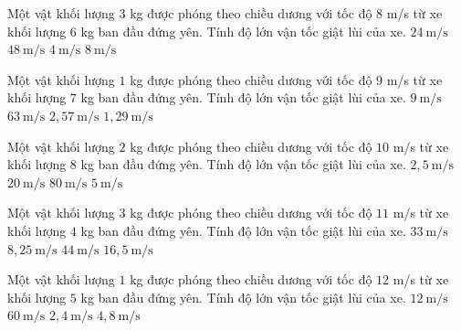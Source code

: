 \begin{ex}
Một vật khối lượng $3$ kg được phóng theo chiều dương với tốc độ $8$ m/s từ xe khối lượng $6$ kg ban đầu đứng yên. Tính độ lớn vận tốc giật lùi của xe.
\choice
{$24\ \mathrm{m/s}$}
{$48\ \mathrm{m/s}$}
{\True $4\ \mathrm{m/s}$}
{$8\ \mathrm{m/s}$}
\end{ex}

\begin{ex}
Một vật khối lượng $1$ kg được phóng theo chiều dương với tốc độ $9$ m/s từ xe khối lượng $7$ kg ban đầu đứng yên. Tính độ lớn vận tốc giật lùi của xe.
\choice
{$9\ \mathrm{m/s}$}
{$63\ \mathrm{m/s}$}
{$2,57\ \mathrm{m/s}$}
{\True $1,29\ \mathrm{m/s}$}
\end{ex}

\begin{ex}
Một vật khối lượng $2$ kg được phóng theo chiều dương với tốc độ $10$ m/s từ xe khối lượng $8$ kg ban đầu đứng yên. Tính độ lớn vận tốc giật lùi của xe.
\choice
{\True $2,5\ \mathrm{m/s}$}
{$20\ \mathrm{m/s}$}
{$80\ \mathrm{m/s}$}
{$5\ \mathrm{m/s}$}
\end{ex}

\begin{ex}
Một vật khối lượng $3$ kg được phóng theo chiều dương với tốc độ $11$ m/s từ xe khối lượng $4$ kg ban đầu đứng yên. Tính độ lớn vận tốc giật lùi của xe.
\choice
{$33\ \mathrm{m/s}$}
{\True $8,25\ \mathrm{m/s}$}
{$44\ \mathrm{m/s}$}
{$16,5\ \mathrm{m/s}$}
\end{ex}

\begin{ex}
Một vật khối lượng $1$ kg được phóng theo chiều dương với tốc độ $12$ m/s từ xe khối lượng $5$ kg ban đầu đứng yên. Tính độ lớn vận tốc giật lùi của xe.
\choice
{$12\ \mathrm{m/s}$}
{$60\ \mathrm{m/s}$}
{\True $2,4\ \mathrm{m/s}$}
{$4,8\ \mathrm{m/s}$}
\end{ex}

